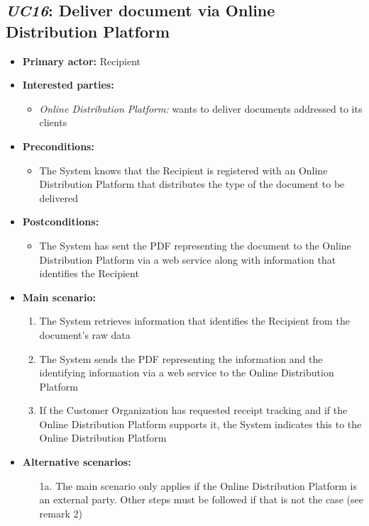 \documentclass[a4paper,10pt]{article}
\begin{document}
\subsection{\emph{UC16}: Deliver document via Online Distribution Platform}
\begin{itemize}
    \item \textbf{Primary actor:} Recipient
    \item \textbf{Interested parties:} 
        \begin{itemize}
            \item \textit{Online Distribution Platform:} wants to deliver documents addressed to its clients
        \end{itemize}

    \item \textbf{Preconditions:}
        \begin{itemize}
            \item The System knows that the Recipient is registered with an Online Distribution Platform that distributes the type of the document to be delivered
        \end{itemize}

    \item \textbf{Postconditions:}
        \begin{itemize}
            \item The System has sent the PDF representing the document to the Online Distribution Platform via a web service along with information
            that identifies the Recipient
        \end{itemize}
        
    \item \textbf{Main scenario:} 
    \begin{enumerate}
       \item The System retrieves information that identifies the Recipient from the document's raw data
       \item The System sends the PDF representing the information and the identifying information via a web service to the Online Distribution Platform
       \item If the Customer Organization has requested receipt tracking and if the Online Distribution Platform supports it, the System indicates this to the Online Distribution Platform
    \end{enumerate}

    \item \textbf{Alternative scenarios:} 
    \begin{enumerate}
    	\item [1a.] The main scenario only applies if the Online Distribution Platform is an external party. Other steps must be followed if that is not the case (see remark 2)
    \end{enumerate}
    

\end{itemize}
\end{document}
